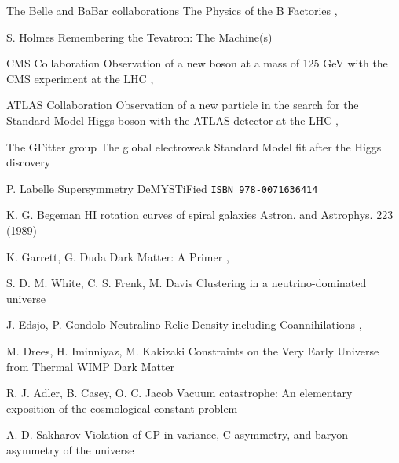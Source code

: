 {The Belle and BaBar collaborations}
{The Physics of the B Factories}
{, }

{S. Holmes}
{Remembering the Tevatron: The Machine(s)}
{}

{CMS Collaboration}
{Observation of a new boson at a mass of 125 GeV with the CMS experiment at the LHC}
{, }

{ATLAS Collaboration}
{Observation of a new particle in the search for the Standard Model Higgs boson with the ATLAS detector at the LHC}
{, }

{The GFitter group}
{The global electroweak Standard Model fit after the Higgs discovery}
{}

{P. Labelle}
{Supersymmetry DeMYSTiFied}
{\texttt{ISBN 978-0071636414}}

{K. G. Begeman}
{HI rotation curves of spiral galaxies}
{Astron. and Astrophys. 223 (1989)}

{K. Garrett, G. Duda}
{Dark Matter: A Primer}
{, }

{S. D. M. White, C. S. Frenk, M. Davis}
{Clustering in a neutrino-dominated universe}
{}

{J. Edsjo, P. Gondolo}
{Neutralino Relic Density including Coannihilations}
{, }

{M. Drees, H. Iminniyaz, M. Kakizaki}
{Constraints on the Very Early Universe from Thermal WIMP Dark Matter}
{ }

{R. J. Adler, B. Casey, O. C. Jacob}
{Vacuum catastrophe: An elementary exposition of the cosmological constant problem}
{}

{A. D. Sakharov}
{Violation of CP in variance, C asymmetry, and baryon asymmetry of the universe}
{}

